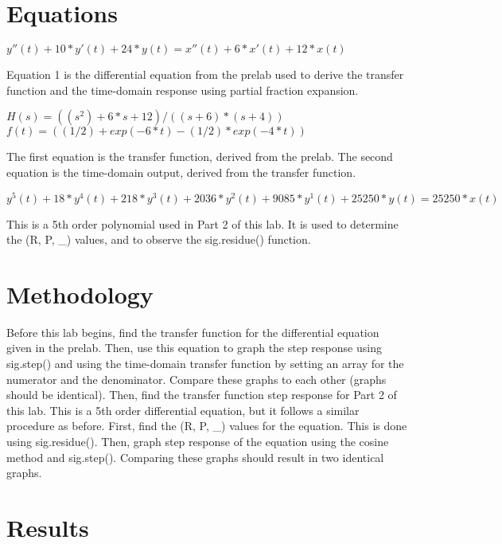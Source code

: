 \documentclass[12pt]{report}
\begin{document}
\section{Equations}

\begin{equation1}
	$y''(t)+10*y'(t)+24*y(t)=x''(t)+6*x'(t)+12*x(t)$
\end{equation1}
	
Equation 1 is the differential equation from the prelab used to derive the transfer function and the time-domain response using partial fraction expansion.

\begin{equation2}
	$H(s)=((s^2)+6*s+12)/((s+6)*(s+4))$
	$f(t)=((1/2)+exp(-6*t)-(1/2)*exp(-4*t))$
\end{equation2}

The first equation is the transfer function, derived from the prelab. The second equation is the time-domain output, derived from the transfer function.

\begin{equation3}
	$y^5(t)+18*y^4(t)+218*y^3(t)+2036*y^2(t)+9085*y^1(t)+25250*y(t)=25250*x(t)$
\end{equation3}

This is a 5th order polynomial used in Part 2 of this lab. It is used to determine the (R, P, _) values, and to observe the sig.residue() function.
	
\section{Methodology}

Before this lab begins, find the transfer function for the differential equation given in the prelab. Then, use this equation to graph the step response using sig.step() and  using the time-domain transfer function by setting an array for the numerator and the denominator. Compare these graphs to each other (graphs should be identical). Then, find the transfer function step response for Part 2 of this lab. This is a 5th order differential equation, but it follows a similar procedure as before. First, find the (R, P, _) values for the equation. This is done using sig.residue(). Then, graph step response of the equation using the cosine method and sig.step(). Comparing these graphs should result in two identical graphs.

\section{Results}
\end{document}

